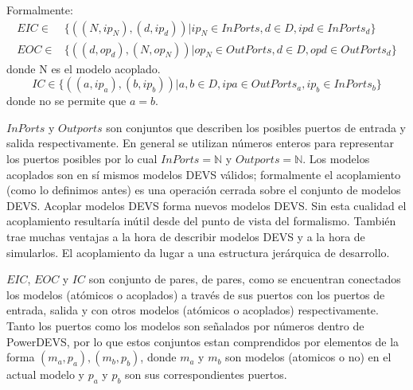 	Formalmente:
	\begin{align*}
	EIC \in& \{((N, ip_N ), (d, ip_d )) | ip_N \in InPorts, d \in D, ip d \in InPorts_d \} \\
	EOC \in& \{((d, op_d ), (N, op_N ))  | op_N \in OutPorts, d \in D, op d \in OutPorts_d \}
	\end{align*}
	donde N es el modelo acoplado.
	\begin{equation*}
	IC \in \{((a, ip_a ), (b, ip_b )) | a, b \in D, ip a \in OutPorts_a , ip_b \in InPorts_b \}
	\end{equation*}
	donde no se permite que $a = b$.

	$InPorts$ y $Outports$ son conjuntos que describen los posibles puertos de entrada y salida respectivamente. En general se utilizan números enteros 
	para representar los puertos posibles por lo cual $InPorts = \mathbb{N}$ y $Outports = \mathbb{N}$. Los modelos acoplados son en sí mismos modelos 
	DEVS válidos; formalmente el acoplamiento (como lo definimos antes) es una operación cerrada sobre el conjunto de modelos DEVS. Acoplar modelos DEVS 
	forma nuevos modelos DEVS. Sin esta cualidad el acoplamiento resultaría inútil desde del punto de vista del formalismo. También trae muchas ventajas 
	a la hora de describir modelos DEVS y a la hora de simularlos. El acoplamiento da lugar a una estructura jerárquica de desarrollo.

	$EIC$, $EOC$ y $IC$ son conjunto de pares, de pares, como se encuentran conectados los modelos (atómicos o acoplados) a través de sus puertos con los 
	puertos de entrada, salida y con otros modelos (atómicos o acoplados) respectivamente. Tanto los puertos como los modelos son señalados por números 
	dentro de PowerDEVS, por lo que estos conjuntos estan comprendidos por elementos de la forma $(m_a, p_a), (m_b, p_b)$, donde $m_a$ y $m_b$ 
	son modelos (atomicos o no) en el actual modelo y $p_a$ y $p_b$ son sus correspondientes puertos.

